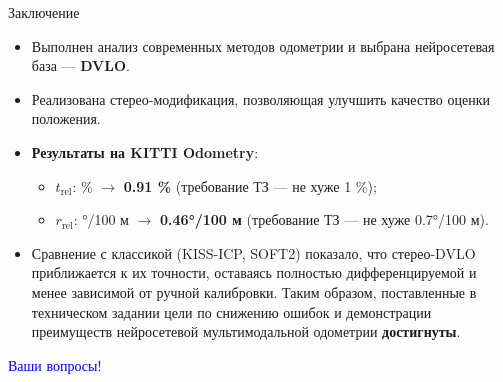 \documentclass{beamer} %
\begin{document}
\begin{frame}{Заключение}
  \footnotesize

  \begin{itemize}
      \item Выполнен анализ современных методов одометрии и выбрана
            нейросетевая база — \textbf{DVLO}.
      \item Реализована стерео-модификация, позволяющая улучшить качество оценки положения.
      \item \textbf{Результаты на KITTI Odometry}:  
            \begin{itemize}
                \item $t_{\mathrm{rel}}$:  \%  $\rightarrow$ \textbf{0.91 \%}  
                      (требование ТЗ — не хуже 1 \%);
                \item $r_{\mathrm{rel}}$: °/100 м $\rightarrow$ \textbf{0.46°/100 м}  
                      (требование ТЗ — не хуже 0.7°/100 м).
            \end{itemize}
      \item Сравнение с классикой (KISS-ICP, SOFT2) показало,
            что стерео-DVLO приближается к их точности,  
            оставаясь полностью дифференцируемой и менее зависимой
            от ручной калибровки.
      Таким образом, поставленные в техническом задании
            цели по снижению ошибок и демонстрации преимуществ
            нейросетевой мультимодальной одометрии \textbf{достигнуты}.
  \end{itemize}
\end{frame}


\begin{frame}
  \centering \Huge \textcolor{blue}{Ваши вопросы!}
\end{frame}
\end{document}
